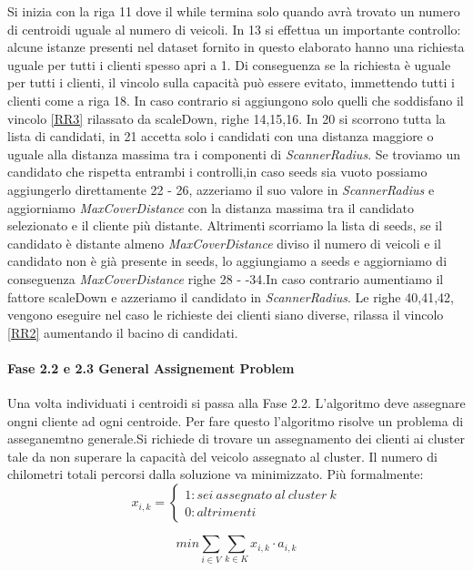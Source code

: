 \documentclass[]{article}
\begin{document}
Si inizia con la riga 11 dove il while termina solo quando avrà trovato un numero di centroidi uguale al numero di veicoli. In 13 si effettua un importante controllo: alcune istanze presenti nel dataset fornito in questo elaborato hanno una richiesta uguale per tutti i clienti spesso apri a 1. Di conseguenza se la richiesta è uguale per tutti i clienti, il vincolo sulla capacità può essere evitato, immettendo tutti i clienti come a riga 18. In caso contrario si aggiungono solo quelli che soddisfano il vincolo \ref{RR3} rilassato da scaleDown, righe 14,15,16. In 20 si scorrono tutta la lista di candidati, in 21 accetta solo i candidati con una distanza maggiore o uguale alla distanza massima tra i componenti di \textit{ScannerRadius}. Se troviamo un candidato che rispetta entrambi i controlli,in caso seeds sia vuoto possiamo aggiungerlo direttamente 22 - 26, azzeriamo il suo valore in \textit{ScannerRadius} e aggiorniamo \textit{MaxCoverDistance} con la distanza massima tra il candidato selezionato e il cliente più distante. Altrimenti scorriamo la lista di seeds, se il candidato è distante almeno \textit{MaxCoverDistance} diviso il numero di veicoli e il candidato non è già presente in seeds, lo aggiungiamo a seeds e aggiorniamo di conseguenza \textit{MaxCoverDistance}  righe 28 - -34.In caso contrario aumentiamo il fattore scaleDown e azzeriamo il candidato in \textit{ScannerRadius}. Le righe 40,41,42, vengono eseguire nel caso le richieste dei clienti siano diverse, rilassa il vincolo \ref{RR2} aumentando il bacino di candidati. 


\paragraph{Fase 2.2 e 2.3  General Assignement Problem} \hfill
Una volta individuati i centroidi si passa alla Fase 2.2. L'algoritmo deve assegnare ongni cliente ad ogni centroide. Per fare questo l'algoritmo risolve un problema di asseganemtno generale.Si richiede di trovare un assegnamento dei clienti ai cluster tale da non superare la capacità del veicolo assegnato al cluster. Il numero di chilometri totali percorsi dalla soluzione va minimizzato. Più formalmente:
\[x_{i,k} = \left\{
\begin{array}{lr}
1 :se i \ assegnato \ al \ cluster \ k \\
0 :altrimenti
\end{array}
\right.
\]

\begin{equation} \label{GAP1}
min \sum_{i \in V} \sum_{k \in K} x_{i,k} \cdot a_{i,k} 
\end{equation}
\end{document}
